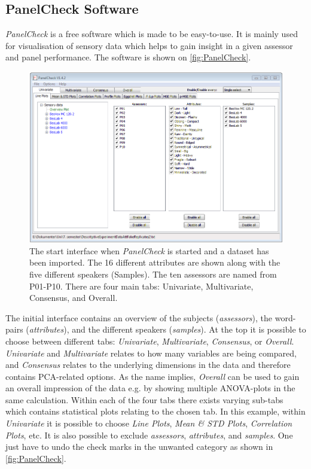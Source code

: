 \subsection*{PanelCheck Software}
\textit{PanelCheck} is a free software which is made to be easy-to-use. It is mainly used for visualisation of sensory data which helps to gain insight in a given assessor and panel performance. The software is shown on \autoref{fig:PanelCheck}.
%
\begin{figure}[H]
\includegraphics[width = \textwidth]{Figure/PanelCheck.png}
\caption{The start interface when \textit{PanelCheck} is started and a dataset has been imported. The 16 different attributes are shown along with the five different speakers (Samples). The ten assessors are named from P01-P10. There are four main tabs: Univariate, Multivariate, Consensus, and Overall.}
\label{fig:PanelCheck}
\end{figure}
\noindent
%
The initial interface contains an overview of the subjects (\textit{assessors}), the word-pairs (\textit{attributes}), and the different speakers (\textit{samples}). At the top it is possible to choose between different tabs: \textit{Univariate}, \textit{Multivariate}, \textit{Consensus}, or \textit{Overall}. \textit{Univariate} and \textit{Multivariate} relates to how many variables are being compared, and \textit{Consensus} relates to the underlying dimensions in the data and therefore contains PCA-related options. As the name implies, \textit{Overall} can be used to gain an overall impression of the data e.g. by showing multiple ANOVA-plots in the same calculation. Within each of the four tabs there exists varying sub-tabs which contains statistical plots relating to the chosen tab. In this example, within \textit{Univariate} it is possible to choose \textit{Line Plots}, \textit{Mean \& STD Plots}, \textit{Correlation Plots}, etc. It is also possible to exclude \textit{assessors}, \textit{attributes}, and \textit{samples}. One just have to undo the check marks in the unwanted category as shown in \autoref{fig:PanelCheck}.
